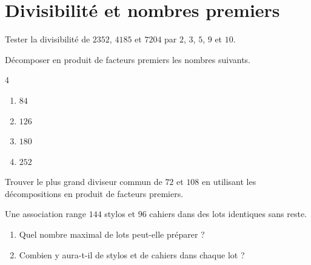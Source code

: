 \documentclass[a4paper,10pt]{report}
\begin{document}
\pagestyle{empty}
\section*{Divisibilité et nombres premiers}

\begin{ex}
Tester la divisibilité de $2352$, $4185$ et $7204$ par $2$, $3$, $5$, $9$ et $10$.
\end{ex}

\begin{ex}
Décomposer en produit de facteurs premiers les nombres suivants.
\begin{multicols}{4}
\begin{enumerate}
\item $84$
\item $126$
\item $180$
\item $252$
\end{enumerate}
\end{multicols}
\end{ex}

\begin{ex}
Trouver le plus grand diviseur commun de $72$ et $108$ en utilisant les décompositions en produit de facteurs premiers.
\end{ex}

\begin{ex}
Une association range $144$ stylos et $96$ cahiers dans des lots identiques sans reste.
\begin{enumerate}
\item Quel nombre maximal de lots peut-elle préparer ?
\item Combien y aura-t-il de stylos et de cahiers dans chaque lot ?
\end{enumerate}
\end{ex}
\end{document}
